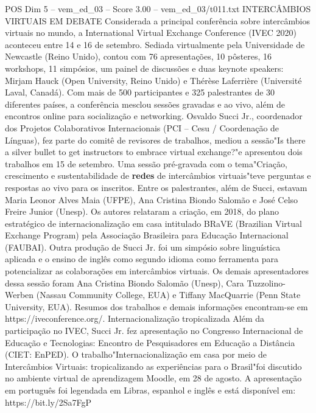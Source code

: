\begin{textsample}{POS Dim 5 – vem\_ed\_03 – Score 3.00 – vem\_ed\_03/t011.txt}  \label{ex:f5_pos_055}
INTERCÂMBIOS VIRTUAIS EM DEBATE Considerada a principal conferência sobre intercâmbios virtuais no mundo, a International Virtual Exchange Conference (IVEC 2020) aconteceu entre 14 e 16 de setembro.
Sediada virtualmente pela Universidade de Newcastle (Reino Unido), contou com 76 apresentações, 10 pôsteres, 16 workshops, 11 simpósios, um painel de discussões e duas keynote speakers: Mirjam Hauck (Open University, Reino Unido) e Thérèse Laferrière (Université Laval, Canadá).
Com mais de 500 participantes e 325 palestrantes de 30 diferentes países, a conferência mesclou sessões gravadas e ao vivo, além de encontros online para socialização e networking.
Osvaldo Succi Jr., coordenador dos Projetos Colaborativos Internacionais (PCI – Cesu / Coordenação de Línguas), fez parte do comitê de revisores de trabalhos, mediou a sessão"Is there a silver bullet to get instructors to embrace virtual exchange?"e apresentou dois trabalhos em 15 de setembro.
Uma sessão pré-gravada com o tema"Criação, crescimento e sustentabilidade de \textbf{redes} de intercâmbios virtuais"teve perguntas e respostas ao vivo para os inscritos.
Entre os palestrantes, além de Succi, estavam Maria Leonor Alves Maia (UFPE), Ana Cristina Biondo Salomão e José Celso Freire Junior (Unesp).
Os autores relataram a criação, em 2018, do plano estratégico de internacionalização em casa intitulado BRaVE (Brazilian Virtual Exchange Program) pela Associação Brasileira para Educação Internacional (FAUBAI).
Outra produção de Succi Jr. foi um simpósio sobre linguística aplicada e o ensino de inglês como segundo idioma como ferramenta para potencializar as colaborações em intercâmbios virtuais.
Os demais apresentadores dessa sessão foram Ana Cristina Biondo Salomão (Unesp), Cara Tuzzolino-Werben (Nassau Community College, EUA) e Tiffany MacQuarrie (Penn State University, EUA).
Resumos dos trabalhos e demais informações encontram-se em https://iveconference.org/.
Internacionalização tropicalizada Além da participação no IVEC, Succi Jr. fez apresentação no Congresso Internacional de Educação e Tecnologias: Encontro de Pesquisadores em Educação a Distância (CIET: EnPED).
O trabalho"Internacionalização em casa por meio de Intercâmbios Virtuais: tropicalizando as experiências para o Brasil"foi discutido no ambiente virtual de aprendizagem Moodle, em 28 de agosto.
A apresentação em português foi legendada em Libras, espanhol e inglês e está disponível em: https://bit.ly/2Sa7FgP

\end{textsample}
